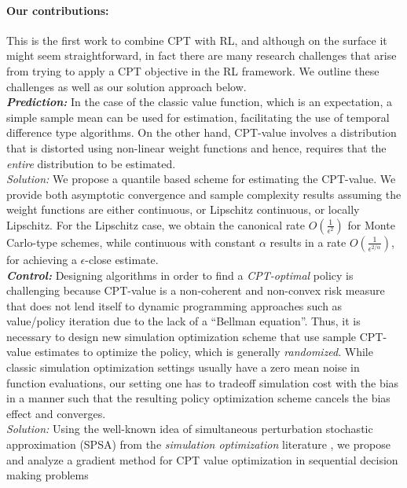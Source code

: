 \paragraph{Our contributions:}
This is the first work to combine CPT with RL, and although on the surface it might seem straightforward, in fact there are many research challenges that arise from trying to apply a CPT objective in the RL framework. We outline these challenges as well as our solution approach below. \\
\textbf{\textit{Prediction:}} In the case of the classic value function, which is an expectation, a simple sample mean can be used for estimation, facilitating the use of temporal difference type algorithms. On the other hand, 
CPT-value   involves a distribution that is distorted using non-linear weight functions and hence, 
requires that the \textit{entire} distribution to be estimated.\\ 
\textit{Solution:} 
We propose a quantile based scheme for estimating the CPT-value.
We provide both asymptotic convergence and sample complexity results assuming the weight functions are either  \holder continuous, or
Lipschitz continuous, or
locally Lipschitz.
For the Lipschitz case, we obtain the canonical rate $O\left(\frac1{\epsilon^2}\right)$ for Monte Carlo-type schemes, while \holder continuous with constant $\alpha$ results in a rate  $O\left(\frac1{\epsilon^{2/\alpha}}\right)$, for achieving a $\epsilon$-close estimate.\\
\textbf{\textit{Control:}} 
Designing algorithms in order to find a \textit{CPT-optimal} policy is challenging because CPT-value is a non-coherent and non-convex risk measure that does not lend itself to dynamic programming approaches such as value/policy iteration due to the lack of a ``Bellman equation''. 
Thus, it is necessary to design new simulation optimization scheme that use sample CPT-value estimates to optimize the policy, which is generally \textit{randomized}. While classic simulation optimization settings usually have a zero mean noise in function evaluations, our setting one has to tradeoff simulation cost with the bias in a manner such that the resulting policy optimization scheme cancels the bias effect and converges. \\
\textit{Solution:} 
Using the well-known idea of simultaneous perturbation stochastic approximation (SPSA) from the \textit{simulation optimization} literature \cite{fu2015handbook}, we propose and analyze a gradient method for CPT value optimization in sequential decision making problems
